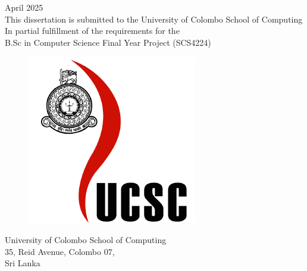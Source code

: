 \begin{titlepage}
\begin{center}
         \large{April 2025}\\
        
     
        
        
        \normalsize {This dissertation is submitted to the University of Colombo School of Computing\\
        In partial fulfillment of the requirements for the \\
      B.Sc in Computer Science Final Year Project (SCS4224)
        }\\
        
        
         \begin{figure} [H]
          \centering
          \includegraphics[scale = 0.3]{img/UCSC-logo.png}
        \end{figure}
        
        \large {University of Colombo School of Computing\\
        35, Reid Avenue, Colombo 07,\\
        Sri Lanka}
        
        \vspace{12pt}
        
       
        


    \end{center}
\end{titlepage}